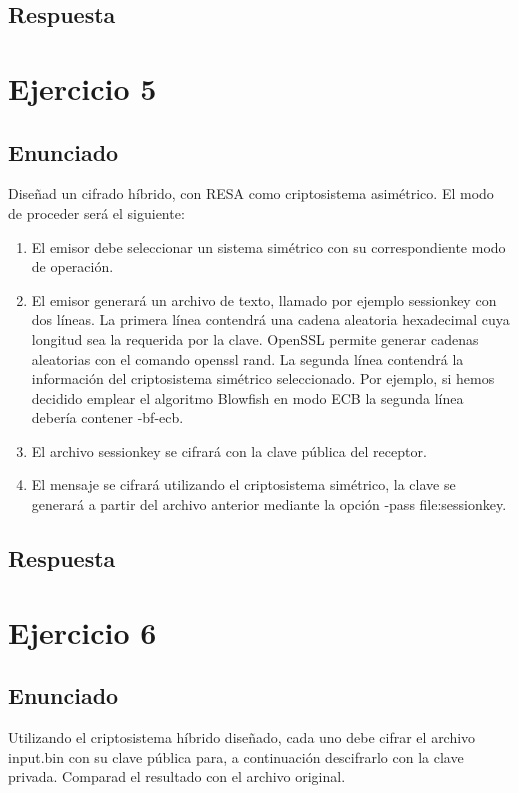 \documentclass[10pt,a4paper,spanish]{report}
\begin{document}
\section{Respuesta}
\noindent

\chapter{Ejercicio 5}

\section{Enunciado}
\noindent
Diseñad un cifrado híbrido, con RESA como criptosistema asimétrico. El modo de proceder será el siguiente:
\begin{enumerate}
 \item El emisor debe seleccionar un sistema simétrico con su correspondiente modo de operación.
 \item El emisor generará un archivo de texto, llamado por ejemplo sessionkey con dos líneas. La primera línea contendrá una cadena aleatoria hexadecimal cuya longitud sea la requerida por la clave. OpenSSL permite generar cadenas aleatorias con el comando openssl rand. La segunda línea contendrá la información del criptosistema simétrico seleccionado. Por ejemplo, si hemos decidido emplear el algoritmo Blowfish en modo ECB la segunda línea debería contener -bf-ecb.
 \item El archivo sessionkey se cifrará con la clave pública del receptor.
 \item El mensaje se cifrará utilizando el criptosistema simétrico, la clave se generará a partir del archivo anterior mediante la opción -pass file:sessionkey.
\end{enumerate}

\section{Respuesta}
\noindent

\chapter{Ejercicio 6}

\section{Enunciado}
\noindent
Utilizando el criptosistema híbrido diseñado, cada uno debe cifrar el archivo input.bin con su clave pública para, a continuación descifrarlo con la clave privada. Comparad el resultado con el archivo original.
\end{document}
